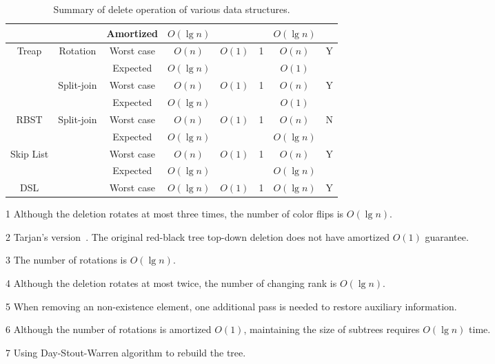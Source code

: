 \begin{table}[!t]
\begin{threeparttable}
\begin{tabular}{cccccccc}
  & & Amortized & $O(\lg n)$ & & & $O(\lg n)$ & \\
  \hline
  \multirow{4}{*}{Treap} & \multirow{2}{*}{Rotation} & Worst case & $O(n)$ & \multirow{2}{*}{$O(1)$} & \multirow{2}{*}{1} & $O(n)$ & \multirow{2}{*}{Y} \\
  & & Expected & $O(\lg n)$ &  & & $O(1)$ & \\
  & \multirow{2}{*}{Split-join} & Worst case & $O(n)$ & \multirow{2}{*}{$O(1)$} & \multirow{2}{*}{1} & $O(n)$ & \multirow{2}{*}{Y} \\
  & & Expected & $O(\lg n)$ & & & $O(1)$ & \\
  \hline
  \multirow{2}{*}{RBST} & \multirow{2}{*}{Split-join}& Worst case & $O(n)$ & \multirow{2}{*}{$O(1)$} & \multirow{2}{*}{1} & $O(n)$ & \multirow{2}{*}{N} \\
  & & Expected & $O(\lg n)$ &  & & $O(\lg n)$ & \\
  \hline
  \multirow{2}{*}{Skip List} & & Worst case & $O(n)$ & \multirow{2}{*}{$O(1)$} & \multirow{2}{*}{1} & $O(n)$ & \multirow{2}{*}{Y} \\
  & & Expected & $O(\lg n)$ & & & $O(\lg n)$ & \\
  \hline
  DSL & & Worst case & $O(\lg n)$ & $O(1)$ & 1 & $O(\lg n)$ & Y \\
\end{tabular}
\begin{tablenotes}\footnotesize
\item[1] Although the deletion rotates at most three times, the number of color flips is $O(\lg n)$.
\item[2] Tarjan's version~\cite{Tarjan1985}. The original red-black tree top-down deletion does not have amortized $O(1)$ guarantee.
\item[3] The number of rotations is $O(\lg n)$.
\item[4] Although the deletion rotates at most twice, the number of changing rank is $O(\lg n)$.
\item[5] When removing an non-existence element, one additional pass is needed to restore auxiliary information.
\item[6] Although the number of rotations is amortized $O(1)$, maintaining the size of subtrees requires $O(\lg n)$ time.
\item[7] Using Day-Stout-Warren algorithm to rebuild the tree.
\end{tablenotes}
\caption{Summary of delete operation of various data structures.}\label{delete}
\end{threeparttable}
\end{table}

\printbibliography[heading=subbibliography]